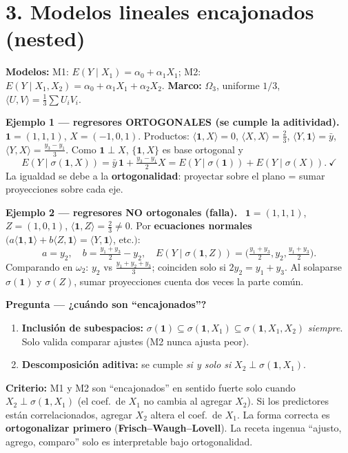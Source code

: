 \documentclass[11pt]{article}
\newcommand{\sg}{\sigma}
\newcommand{\inc}[1]{\smallskip\noindent\textbf{\color{blue!30!black}#1}\ }
\begin{document}
\section*{3. Modelos lineales encajonados (nested)}
\textbf{Modelos:} M1: $E(Y\mid X_1)=\alpha_0+\alpha_1X_1$; M2: $E(Y\mid X_1,X_2)=\alpha_0+\alpha_1X_1+\alpha_2X_2$.
\textbf{Marco:} $\Omega_3$, uniforme $1/3$, $\langle U,V\rangle=\tfrac13\sum U_iV_i$.

\inc{Ejemplo 1 — regresores ORTOGONALES (se cumple la aditividad).}
$\mathbf 1=(1,1,1)$, $X=(-1,0,1)$. Productos: $\langle\mathbf 1,X\rangle=0$, $\langle X,X\rangle=\tfrac23$,
$\langle Y,\mathbf 1\rangle=\bar y$, $\langle Y,X\rangle=\tfrac{y_3-y_1}{3}$. Como $\mathbf 1\perp X$,
$\{\mathbf 1,X\}$ es base ortogonal y
\[ E(Y\mid\sg(\mathbf 1,X))=\bar y\,\mathbf 1+\tfrac{y_3-y_1}{2}X=E(Y\mid\sg(\mathbf 1))+E(Y\mid\sg(X)).\ \checkmark \]
La igualdad se debe a la \textbf{ortogonalidad}: proyectar sobre el plano = sumar proyecciones sobre cada eje.

\inc{Ejemplo 2 — regresores NO ortogonales (falla).}
$\mathbf 1=(1,1,1)$, $Z=(1,0,1)$, $\langle\mathbf 1,Z\rangle=\tfrac23\neq0$. Por \textbf{ecuaciones normales}
$\big(a\langle\mathbf 1,\mathbf 1\rangle+b\langle Z,\mathbf 1\rangle=\langle Y,\mathbf 1\rangle$, etc.$\big)$:
\[ a=y_2,\quad b=\tfrac{y_1+y_3}{2}-y_2,\quad E(Y\mid\sg(\mathbf 1,Z))=\Big(\tfrac{y_1+y_3}{2},y_2,\tfrac{y_1+y_3}{2}\Big). \]
Comparando en $\omega_2$: $y_2$ vs $\tfrac{y_1+y_2+y_3}{3}$; coinciden solo si $2y_2=y_1+y_3$. Al solaparse
$\sg(\mathbf 1)$ y $\sg(Z)$, sumar proyecciones cuenta dos veces la parte común.

\inc{Pregunta — ¿cuándo son ``encajonados''?}
\begin{enumerate}[leftmargin=1.6em,itemsep=2pt]
\item \textbf{Inclusión de subespacios:} $\sg(\mathbf 1)\subseteq\sg(\mathbf 1,X_1)\subseteq\sg(\mathbf 1,X_1,X_2)$
\emph{siempre}. Solo valida comparar ajustes (M2 nunca ajusta peor).
\item \textbf{Descomposición aditiva:} se cumple \emph{si y solo si} $X_2\perp\sg(\mathbf 1,X_1)$.
\end{enumerate}
\begin{keybox}
\textbf{Criterio:} M1 y M2 son ``encajonados'' en sentido fuerte solo cuando $X_2\perp\sg(\mathbf 1,X_1)$
(el coef.\ de $X_1$ no cambia al agregar $X_2$). Si los predictores están correlacionados, agregar $X_2$
altera el coef.\ de $X_1$. La forma correcta es \textbf{ortogonalizar primero} (\textbf{Frisch--Waugh--Lovell}).
La receta ingenua ``ajusto, agrego, comparo'' solo es interpretable bajo ortogonalidad.
\end{keybox}
\end{document}
